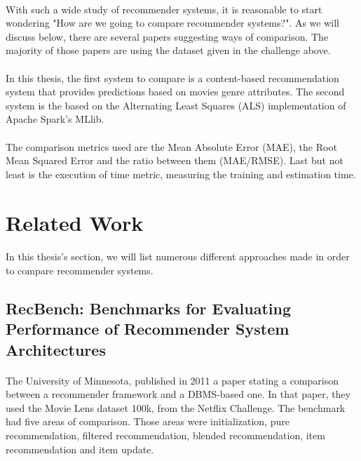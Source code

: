 \paragraph{} With such a wide study of recommender systems, it is reasonable to start wondering "How are we going to compare recommender systems?". As we will discuss below, there are several papers suggesting ways of comparison. The majority of those papers are using the dataset given in the challenge above.

\paragraph{} In this thesis, the first system to compare is a content-based recommendation system that provides predictions based on movies genre attributes. The second system is the based on the Alternating Least Squares (ALS) implementation of Apache Spark's MLlib.

\paragraph{} The comparison metrics used are the Mean Absolute Error (MAE), the Root Mean Squared Error and the ratio between them (MAE/RMSE). Last but not least is the execution of time metric, measuring the training and estimation time.

\section{Related Work}
\paragraph{} In this thesis's section, we will list numerous different approaches made in order to compare recommender systems.

\subsection{RecBench: Benchmarks for Evaluating Performance of Recommender System Architectures \cite{levandoski2011recbench}}
\paragraph{} The University of Minnesota, published in 2011 a paper stating a comparison between a recommender framework and a DBMS-based one. In that paper, they used the Movie Lens dataset 100k, from the Netflix Challenge. The benchmark had five areas of comparison. Those areas were initialization, pure recommendation, filtered recommendation, blended recommendation, item recommendation and item update.

